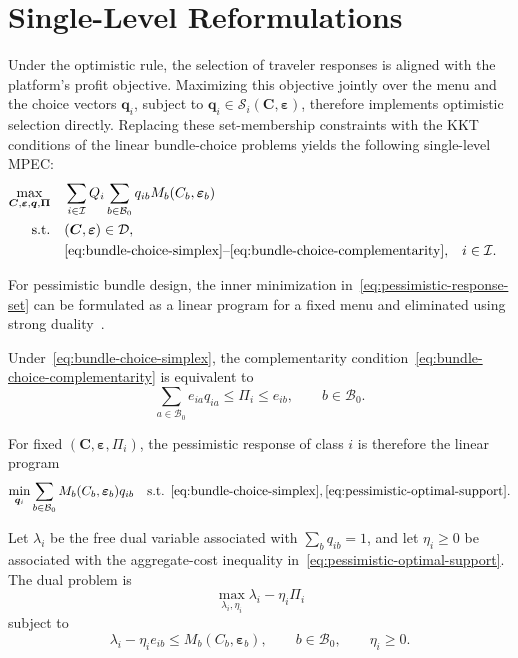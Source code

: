 \documentclass{article}
\begin{document}
\section{Single-Level Reformulations}
\label{sec:single-level-reformulations}

Under the optimistic rule, the selection of traveler responses is
aligned with the platform's profit objective. Maximizing this objective
jointly over the menu and the choice vectors $\bm q_i$, subject to
$\bm q_i\in\mathcal S_i(\bm C,\bm\varepsilon)$, therefore implements
optimistic selection directly. Replacing these set-membership
constraints with the KKT conditions of the linear bundle-choice
problems yields the following single-level MPEC:
\begin{equation}
\begin{aligned}
    \max_{\bm C,\bm\varepsilon,\bm q,\bm\Pi}
    \quad&
    \sum_{i\in\mathcal I}Q_i
    \sum_{b\in\mathcal B_0}
    q_{ib}M_b(C_b,\bm\varepsilon_b)\\
    \text{s.t.}\quad&
    (\bm C,\bm\varepsilon)\in\mathcal D,\\
    &\eqref{eq:bundle-choice-simplex}\text{--}\eqref{eq:bundle-choice-complementarity},
    &&i\in\mathcal I.
\end{aligned}
\label{eq:optimistic-single-level}
\end{equation}

For pessimistic bundle design, the inner minimization
in~\eqref{eq:pessimistic-response-set} can be formulated as a linear
program for a fixed menu and eliminated using strong
duality~\citep{SteinZemkoho2026}.

Under~\eqref{eq:bundle-choice-simplex}, the complementarity
condition~\eqref{eq:bundle-choice-complementarity} is equivalent to
\begin{equation}
    \sum_{a\in\mathcal B_0}e_{ia}q_{ia}
    \leq\Pi_i\leq e_{ib},
    \qquad b\in\mathcal B_0.
    \label{eq:pessimistic-optimal-support}
\end{equation}

For fixed $(\bm C,\bm\varepsilon,\Pi_i)$, the pessimistic response of
class $i$ is therefore the linear program
\begin{equation}
    \min_{\bm q_i}
    \sum_{b\in\mathcal B_0}
    M_b(C_b,\bm\varepsilon_b)q_{ib}
    \quad
    \text{s.t. }
    \eqref{eq:bundle-choice-simplex},
    \eqref{eq:pessimistic-optimal-support}.
    \label{eq:pessimistic-inner-lp}
\end{equation}

Let $\lambda_i$ be the free dual variable associated with
$\sum_bq_{ib}=1$, and let $\eta_i\geq0$ be associated with the
aggregate-cost inequality in~\eqref{eq:pessimistic-optimal-support}.
The dual problem is
\begin{equation}
    \max_{\lambda_i,\eta_i}
    \lambda_i-\eta_i\Pi_i
    \label{eq:pessimistic-inner-dual}
\end{equation}
subject to
\begin{equation}
    \lambda_i-\eta_i e_{ib}
    \leq
    M_b(C_b,\bm\varepsilon_b),
    \qquad
    b\in\mathcal B_0,
    \qquad
    \eta_i\geq0.
    \label{eq:pessimistic-dual-feasibility}
\end{equation}
\end{document}
